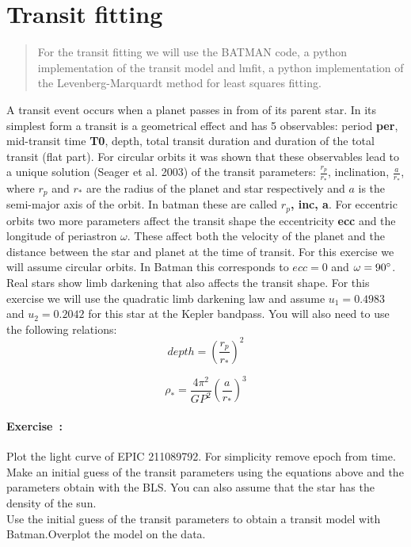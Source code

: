 \documentclass[12pt,twoside]{article}
\newcommand{\problemname}{Exercise}
\newcounter{problem}
\newenvironment{problem}{\paragraph{\problemname~\theproblem:}\refstepcounter{problem}}{}
\def\degr{\hbox{$^\circ$}}
\begin{document}
\section*{Transit fitting}

\begin{quote}
    For the transit fitting we will use the BATMAN code, a python implementation of the transit model and lmfit, a python implementation of the Levenberg-Marquardt method for least squares fitting.
\end{quote}


A transit event occurs when a planet passes in from of its parent star. In its simplest form a transit is a geometrical effect and has 5 observables: period \textbf{per}, mid-transit time \textbf{T0}, depth, total transit duration and duration of the total transit (flat part). For circular orbits it was shown that these observables lead to a unique solution (Seager et al. 2003) of the transit parameters: $\frac{r_p}{r_{*}}$, inclination, $\frac{a}{r_{*}}$, where  $r_p$ and $r_{*}$ are the radius of the planet and star respectively and $a$ is the semi-major axis of the orbit. In batman these are called \textbf{$r_p$, inc, a}. For eccentric orbits two more parameters affect the transit shape the eccentricity \textbf{ecc} and the longitude of periastron \textbf{$\omega$}. These affect both the velocity of the planet and  the distance between the star and planet at the time of transit. For this exercise we will assume circular orbits. In Batman this corresponds to $ecc = 0$ and $\omega = 90\degr$.  Real stars show limb darkening that also affects the transit shape. For this exercise we will use the quadratic limb darkening law and assume   $u_1= 0.4983$ and $u_2= 0.2042$ for this star at the Kepler bandpass. You will also need to use the following relations:
\begin{equation}
depth= \left( \frac{r_p}{r_{*}} \right)^2
\end{equation}

\begin{equation}
\rho_*=  \frac{4 \pi^2}{G P^2}   \left( \frac{a}{r_{*}} \right)^3
\end{equation}


\vfill
\begin{problem}\label{prob:easy}
Plot the light curve of EPIC 211089792. For simplicity remove epoch from time.\\
Make an initial guess of the transit parameters using the equations above and the parameters obtain with the BLS. You can also assume that the star has the density of the sun. \\
Use the initial guess of the transit parameters to obtain a transit model with Batman.Overplot the model on the data.
\end{problem}
\end{document}
